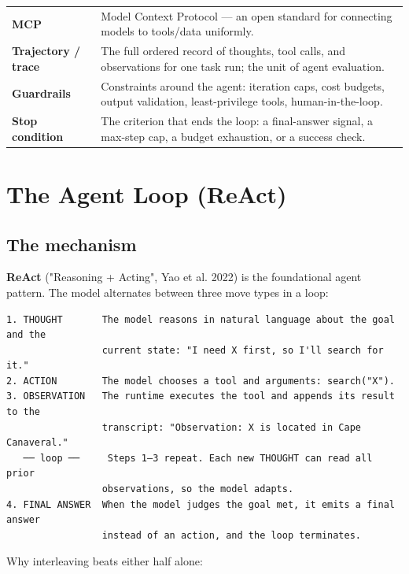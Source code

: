 \documentclass[11pt]{article}
\begin{document}
\begin{longtable}[]{@{}
  >{\raggedright\arraybackslash}p{}
  >{\raggedright\arraybackslash}p{}@{}}
\rowcolor{zebra}
\textbf{MCP} & Model Context Protocol --- an open standard for connecting models to tools/data uniformly. \\
\textbf{Trajectory / trace} & The full ordered record of thoughts, tool calls, and observations for one task run; the unit of agent evaluation. \\
\rowcolor{zebra}
\textbf{Guardrails} & Constraints around the agent: iteration caps, cost budgets, output validation, least-privilege tools, human-in-the-loop. \\
\textbf{Stop condition} & The criterion that ends the loop: a final-answer signal, a max-step cap, a budget exhaustion, or a success check. \\
\end{longtable}

\section{The Agent Loop (ReAct)}\label{the-agent-loop-react}

\subsection{The mechanism}\label{the-mechanism}

\textbf{ReAct} ("Reasoning + Acting", Yao et al. 2022) is the foundational agent pattern. The model alternates between three move types in a loop:

\setcodelang{}

\begin{verbatim}
1. THOUGHT       The model reasons in natural language about the goal and the
                 current state: "I need X first, so I'll search for it."
2. ACTION        The model chooses a tool and arguments: search("X").
3. OBSERVATION   The runtime executes the tool and appends its result to the
                 transcript: "Observation: X is located in Cape Canaveral."
   ── loop ──     Steps 1–3 repeat. Each new THOUGHT can read all prior
                 observations, so the model adapts.
4. FINAL ANSWER  When the model judges the goal met, it emits a final answer
                 instead of an action, and the loop terminates.
\end{verbatim}

Why interleaving beats either half alone:
\end{document}
